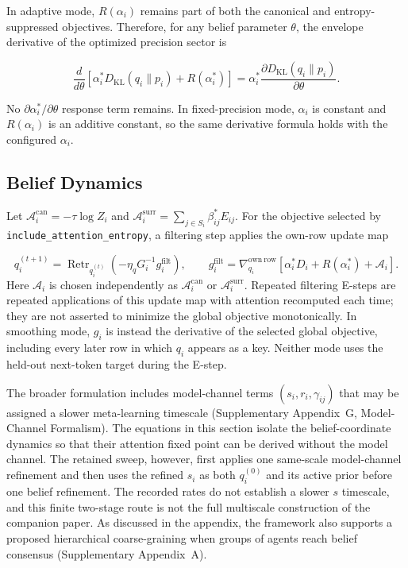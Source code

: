 \documentclass[twoside,11pt]{article}
\begin{document}
In adaptive mode, $R(\alpha_i)$ remains part of both the canonical and entropy-suppressed objectives. Therefore, for any belief parameter $\theta$, the envelope derivative of the optimized precision sector is

\begin{equation}
\frac{d}{d\theta}
\left[\alpha_i^*D_{\mathrm{KL}}(q_i\|p_i)+R(\alpha_i^*)\right]
=\alpha_i^*\frac{\partial D_{\mathrm{KL}}(q_i\|p_i)}{\partial\theta}.
\label{eq:alpha_envelope_gradient}
\end{equation}

No $\partial\alpha_i^*/\partial\theta$ response term remains. In fixed-precision mode, $\alpha_i$ is constant and $R(\alpha_i)$ is an additive constant, so the same derivative formula holds with the configured $\alpha_i$.


\subsection{Belief Dynamics}

Let $\mathcal{A}_i^{\mathrm{can}}=-\tau\log Z_i$ and $\mathcal{A}_i^{\mathrm{surr}}=\sum_{j\in S_i}\beta_{ij}^*E_{ij}$. For the objective selected by \texttt{include\_attention\_entropy}, a filtering step applies the own-row update map

\begin{equation}
q_i^{(t+1)}
=\operatorname{Retr}_{q_i^{(t)}}\left(-\eta_qG_i^{-1}g_i^{\mathrm{filt}}\right),
\qquad
g_i^{\mathrm{filt}}
=\nabla_{q_i}^{\mathrm{own\ row}}
\left[\alpha_i^*D_i+R(\alpha_i^*)+\mathcal{A}_i\right].
\label{eq:belief_dynamics}
\end{equation}
Here $\mathcal{A}_i$ is chosen independently as $\mathcal{A}_i^{\mathrm{can}}$ or $\mathcal{A}_i^{\mathrm{surr}}$. Repeated filtering E-steps are repeated applications of this update map with attention recomputed each time; they are not asserted to minimize the global objective monotonically. In smoothing mode, $g_i$ is instead the derivative of the selected global objective, including every later row in which $q_i$ appears as a key. Neither mode uses the held-out next-token target during the E-step.

The broader formulation includes model-channel terms $(s_i,r_i,\gamma_{ij})$ that may be assigned a slower meta-learning timescale (Supplementary Appendix~G, Model-Channel Formalism). The equations in this section isolate the belief-coordinate dynamics so that their attention fixed point can be derived without the model channel. The retained sweep, however, first applies one same-scale model-channel refinement and then uses the refined $s_i$ as both $q_i^{(0)}$ and its active prior before one belief refinement. The recorded rates do not establish a slower $s$ timescale, and this finite two-stage route is not the full multiscale construction of the companion paper. As discussed in the appendix, the framework also supports a proposed hierarchical coarse-graining when groups of agents reach belief consensus (Supplementary Appendix~A).
\end{document}
